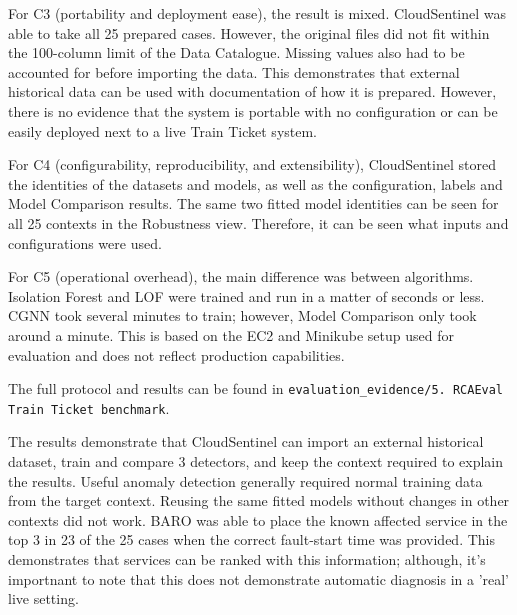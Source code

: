 

For C3 (portability and deployment ease), the result is mixed. CloudSentinel was able to take all 25 prepared cases. However, the original files did not fit within the 100-column limit of the Data Catalogue. Missing values also had to be accounted for before importing the data. This demonstrates that external historical data can be used with documentation of how it is prepared. However, there is no evidence that the system is portable with no configuration or can be easily deployed next to a live Train Ticket system.

For C4 (configurability, reproducibility, and extensibility), CloudSentinel stored the identities of the datasets and models, as well as the configuration, labels and Model Comparison results. The same two fitted model identities can be seen for all 25 contexts in the Robustness view. Therefore, it can be seen what inputs and configurations were used.

For C5 (operational overhead), the main difference was between algorithms. Isolation Forest and LOF were trained and run in a matter of seconds or less. CGNN took several minutes to train; however, Model Comparison only took around a minute. This is based on the EC2 and Minikube setup used for evaluation and does not reflect production capabilities.

The full protocol and results can be found in \texttt{evaluation\_evidence/5. RCAEval Train Ticket benchmark}.

The results demonstrate that CloudSentinel can import an external historical dataset, train and compare 3 detectors, and keep the context required to explain the results. Useful anomaly detection generally required normal training data from the target context. Reusing the same fitted models without changes in other contexts did not work. BARO was able to place the known affected service in the top 3 in 23 of the 25 cases when the correct fault-start time was provided. This demonstrates that services can be ranked with this information; although, it's importnant to note that this does not demonstrate automatic diagnosis in a 'real' live setting.

